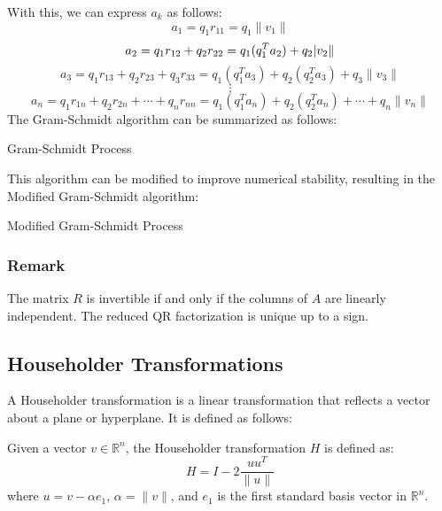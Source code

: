 \documentclass[11pt]{article}
\begin{document}
With this, we can express \(a_k\) as follows:
\[a_1 = q_1 r_{11} = q_1 \|v_1\|\]
\[a_2 = q_1 r_{12} + q_2 r_{22} = q_1 (q_1^T a_2) + q_2 \\|v_2\|\]
\[a_3 = q_1 r_{13} + q_2 r_{23} + q_3 r_{33} = q_1 (q_1^T a_3) + q_2 (q_2^T a_3) + q_3 \|v_3\|\]
\[\vdots\]
\[a_n = q_1 r_{1n} + q_2 r_{2n} + \cdots + q_n r_{nn} = q_1 (q_1^T a_n) + q_2 (q_2^T a_n) + \cdots + q_n \|v_n\|\]
\vskip 0.5cm
The Gram-Schmidt algorithm can be summarized as follows:

\begin{algorithm}[H]
\caption{Gram-Schmidt Process}
\end{algorithm}
\vskip 0.5cm
This algorithm can be modified to improve numerical stability, resulting in the Modified Gram-Schmidt algorithm:

\begin{algorithm}[H]
\caption{Modified Gram-Schmidt Process}
\end{algorithm}

\subsubsection*{Remark}
The matrix \(R\) is invertible if and only if the columns of \(A\) are linearly independent. The reduced QR factorization is unique up to a sign.

\subsection{Householder Transformations}
A Householder transformation is a linear transformation that reflects a vector about a plane or hyperplane. It is defined as follows:

Given a vector \(v \in \mathbb{R}^n\), the Householder transformation \(H\) is defined as:
\[H = I - 2 \frac{u u^T}{\|u\|}\]
where \(u = v - \alpha e_1\), \(\alpha = \|v\|\), and \(e_1\) is the first standard basis vector in \(\mathbb{R}^n\).  
\end{document}
